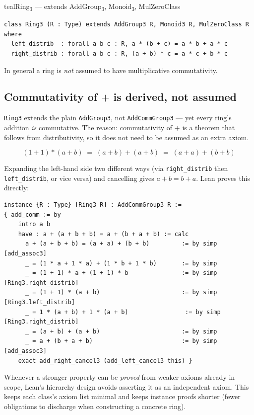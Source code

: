 \documentclass[11pt]{article}
\begin{document}
\begin{defbox}{teal}{Ring\textsubscript{3} --- extends AddGroup\textsubscript{3}, Monoid\textsubscript{3}, MulZeroClass}
\begin{lstlisting}
class Ring3 (R : Type) extends AddGroup3 R, Monoid3 R, MulZeroClass R where
  left_distrib  : forall a b c : R, a * (b + c) = a * b + a * c
  right_distrib : forall a b c : R, (a + b) * c = a * c + b * c
\end{lstlisting}
In general a ring is \emph{not} assumed to have multiplicative commutativity.
\end{defbox}

\subsection{Commutativity of \texorpdfstring{$+$}{+} is derived, not assumed}

\texttt{Ring3} extends the plain \texttt{AddGroup3}, not \texttt{AddCommGroup3} --- yet every ring's addition \emph{is} commutative. The reason: commutativity of $+$ is a theorem that follows from distributivity, so it does not need to be assumed as an extra axiom.

\[
(1+1)*(a+b) \;=\; (a+b)+(a+b) \;=\; (a+a)+(b+b)
\]

Expanding the left-hand side two different ways (via \texttt{right\_distrib} then \texttt{left\_distrib}, or vice versa) and cancelling gives $a+b=b+a$. Lean proves this directly:

\begin{lstlisting}
instance {R : Type} [Ring3 R] : AddCommGroup3 R :=
{ add_comm := by
    intro a b
    have : a + (a + b + b) = a + (b + a + b) := calc
      a + (a + b + b) = (a + a) + (b + b)         := by simp [add_assoc3]
      _ = (1 * a + 1 * a) + (1 * b + 1 * b)       := by simp
      _ = (1 + 1) * a + (1 + 1) * b               := by simp [Ring3.right_distrib]
      _ = (1 + 1) * (a + b)                       := by simp [Ring3.left_distrib]
      _ = 1 * (a + b) + 1 * (a + b)                := by simp [Ring3.right_distrib]
      _ = (a + b) + (a + b)                       := by simp
      _ = a + (b + a + b)                         := by simp [add_assoc3]
    exact add_right_cancel3 (add_left_cancel3 this) }
\end{lstlisting}

\begin{takeaway}
Whenever a stronger property can be \emph{proved} from weaker axioms already in scope, Lean's hierarchy design avoids asserting it as an independent axiom. This keeps each class's axiom list minimal and keeps instance proofs shorter (fewer obligations to discharge when constructing a concrete ring).
\end{takeaway}
\end{document}
